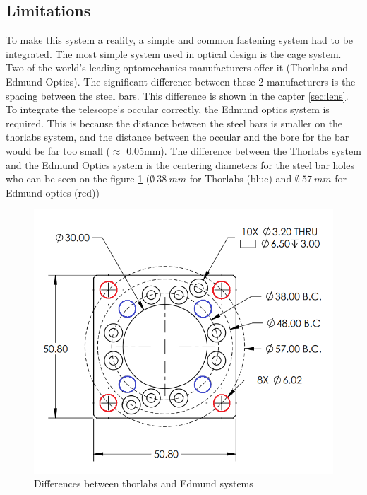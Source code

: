 \subsection{Limitations}
To make this system a reality, a simple and common fastening system had to be integrated. The most simple system used in optical design 
is the cage system. Two of the world's leading optomechanics manufacturers offer it (Thorlabs and Edmund Optics). The significant difference 
between these 2 manufacturers is the spacing between the steel bars. This difference is shown in the capter \ref{sec:lens}. \newline
To integrate the telescope's occular correctly, the Edmund optics system is required. This is because the distance between the steel bars 
is smaller on the thorlabs system, and the distance between the occular and the bore for the bar would be far too small ($\approx$ 0.05mm).
\bigbreak
The difference between the Thorlabs system and the Edmund Optics system is the centering diameters for the steel bar holes who 
can be seen on the figure \ref{fig:thorlabs_Edmund} ($\emptyset\ 38\ mm$ for Thorlabs (blue) and $\emptyset\ 57\ mm$ for Edmund optics (red))
\begin{figure}[H]
    \centering
    \includegraphics[scale=1]{assets/figures/Mechanical Design/Thorlabs_Edmund.png}
    \caption{Differences between thorlabs and Edmund systems}
    \label{fig:thorlabs_Edmund}
\end{figure}
